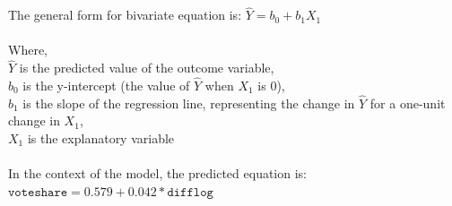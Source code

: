 \documentclass[12pt,letterpaper]{article}
\begin{document}
\begin{enumerate}
		\noindent The general form for bivariate equation is:
		$\hat{Y} = b_0 + b_1 X_1$\\
		\\Where,\\
		$\hat{Y}$ is the predicted value of the outcome variable,\\
		$b_0$ is the y-intercept (the value of $\hat{Y}$ when $X_1$ is 0),\\
		$b_1$ is the slope of the regression line, representing the change in $\hat{Y}$ for a one-unit change in $X_1$,\\
		$X_1$ is the explanatory variable\\
		\\
		In the context of the model, the predicted equation is:\\
		\textit{$\texttt{voteshare} = 0.579 + 0.042*\texttt{difflog}$}

	\end{enumerate}
	\vspace*{1cm}
\end{document}
